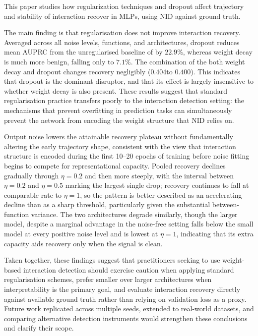 \documentclass{article}
\begin{document}
This paper studies how regularization techniques and dropout affect trajectory and stability of interaction recover in MLPs, using NID against ground truth.

The main finding is that regularisation does not improve interaction recovery. Averaged
across all noise levels, functions, and architectures, dropout reduces mean AUPRC from the
unregularised baseline of by $22.9\%$, whereas weight decay is
much more benign, falling only to $7.1\%$. The combination of the both weight decay and dropout
changes recovery negligibly ($0.404$to $0.400$).
This indicates that dropout is the dominant disruptor, and that
its effect is largely insensitive to whether weight decay is also present. These results
suggest that standard regularisation practice transfers poorly to the interaction detection
setting: the mechanisms that prevent overfitting in prediction tasks can simultaneously
prevent the network from encoding the weight structure that NID relies on.

Output noise lowers the attainable recovery plateau without fundamentally altering the early
trajectory shape, consistent with the view that interaction structure is encoded during the
first 10--20 epochs of training before noise fitting begins to compete for representational
capacity. Pooled recovery declines gradually through $\eta = 0.2$ and then more steeply,
with the interval between $\eta = 0.2$ and $\eta = 0.5$ marking the largest single drop;
recovery continues to fall at comparable rate to $\eta = 1$, so the pattern is better
described as an accelerating decline than as a sharp threshold, particularly given the
substantial between-function variance. The two architectures degrade similarly, though the
larger model, despite a marginal advantage in the noise-free setting falls below the
small model at every positive noise level and is lowest at $\eta = 1$, indicating that its
extra capacity aids recovery only when the signal is clean.

Taken together, these findings suggest that practitioners seeking to use
weight-based interaction detection should exercise caution when applying
standard regularisation schemes, prefer smaller over larger architectures when
interpretability is the primary goal, and evaluate interaction recovery directly
against available ground truth rather than relying on validation loss as a
proxy. Future work replicated across multiple seeds, extended to real-world
datasets, and comparing alternative detection instruments would strengthen
these conclusions and clarify their scope.
\end{document}
